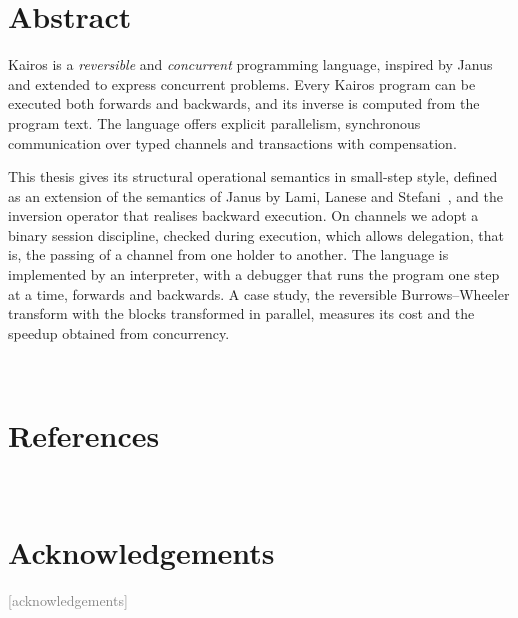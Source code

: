 \documentclass[12pt,a4paper,twoside]{book}
\begin{document}



\chapter*{Abstract}
Kairos is a \emph{reversible} and \emph{concurrent} programming language,
inspired by Janus~\cite{YokoyamaGluck2007} and extended to express concurrent
problems. Every Kairos program can be executed both forwards and backwards, and
its inverse is computed from the program text. The language offers explicit
parallelism, synchronous communication over typed channels and transactions
with compensation.

This thesis gives its structural operational semantics in small-step style,
defined as an extension of the semantics of Janus by Lami, Lanese and
Stefani~\cite{LamiLaneseStefani2024}, and the inversion operator that realises
backward execution. On channels we adopt a binary session discipline, checked
during execution, which allows delegation, that is, the passing of a channel
from one holder to another.
The language is implemented by an interpreter, with a debugger that runs the
program one step at a time, forwards and backwards. A case study, the
reversible Burrows--Wheeler transform with the blocks transformed in
parallel, measures its cost and the speedup obtained from concurrency.

\topmargin=-1cm
\tableofcontents
\thispagestyle{empty}
\listoftables
\thispagestyle{empty}
\newpage~\newpage

\setcounter{chapter}{-1}   %
\raggedbottom
\pagestyle{plain}
\setcounter{page}{1}



\renewcommand{\bibsection}{}
\chapter*{References}

\newpage


\newpage~\newpage
\chapter*{Acknowledgements}
\textcolor{gray}{[acknowledgements]}
\end{document}
